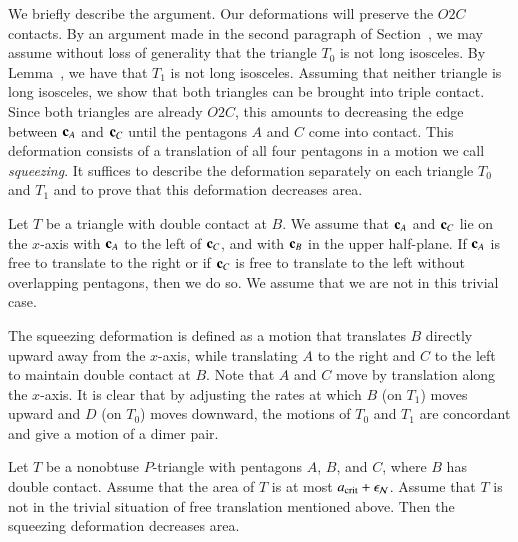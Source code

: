 We briefly describe the argument.  Our deformations will preserve the
$O2C$ contacts.  By an argument made in the second paragraph of
Section~, we may assume without loss of generality that
the triangle $T_0$ is not long isosceles.  By
Lemma~, we have that $T_1$ is not long
isosceles.  Assuming that neither triangle is long isosceles, we show
that both triangles can be brought into triple contact.  Since both
triangles are already $O2C$, this amounts to decreasing the edge
between ${\mathbf c}_A$ and ${\mathbf c}_C$ until the pentagons $A$ and $C$ come into
contact.  This deformation consists of a translation of all four
pentagons in a motion we call {\it squeezing}.  It suffices to
describe the deformation separately on each triangle $T_0$ and $T_1$
and to prove that this deformation decreases area.

Let $T$ be a triangle with double contact at $B$.  We assume that
${\mathbf c}_A$ and ${\mathbf c}_C$ lie on the $x$-axis with ${\mathbf c}_A$ to the left of
${\mathbf c}_C$, and with ${\mathbf c}_B$ in the upper half-plane.  If ${\mathbf c}_A$ is free to
translate to the right or if ${\mathbf c}_C$ is free to translate to the left
without overlapping pentagons, then we do so.  We assume that we are not
in this trivial case.

The squeezing deformation is defined as a motion that translates $B$
directly upward away from the $x$-axis, while translating $A$ to the
right and $C$ to the left to maintain double contact at $B$.  Note
that $A$ and $C$ move by translation along the $x$-axis.  It is clear
that by adjusting the rates at which $B$ (on $T_1$) moves upward and
$D$ (on $T_0$) moves downward, the motions of $T_0$ and $T_1$ are
concordant and give a motion of a dimer pair.

\begin{lemma}  
  Let $T$ be a nonobtuse $P$-triangle with pentagons $A$, $B$, and
  $C$, where $B$ has double contact.  Assume that the area of $T$ is
  at most $a_\text{crit}+\epsilon_{\mathcal N}$.  Assume that $T$ is not in the trivial
  situation of free translation mentioned above.  Then the squeezing
  deformation decreases area.
\end{lemma}

